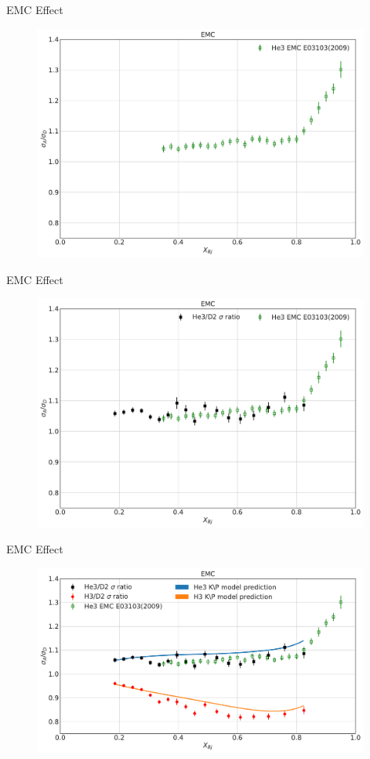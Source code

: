 \documentclass{beamer}
\begin{document}
\begin{frame}{EMC Effect}
\vspace{-20pt}
	\begin{figure}
		\includegraphics[width=11cm]{../images/EMC1.pdf}
	\end{figure}
\end{frame}
\begin{frame}{EMC Effect}
\vspace{-20pt}
\begin{figure}
	\includegraphics[width=11cm]{../images/EMC2.pdf}
\end{figure}
\end{frame}

\begin{frame}{EMC Effect}
\vspace{-20pt}
\begin{figure}
	\includegraphics[width=11cm]{../images/EMC.pdf}
\end{figure}
\end{frame}
\end{document}
